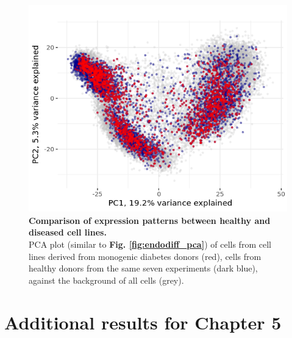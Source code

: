 \begin{figure}[h]
    \centering
    \includegraphics[width=15cm]{Appendix2/Fig/suppl_diabetes_lines.png}
    \caption[PCA of healthy and diseased cell lines]{\textbf{Comparison of expression patterns between healthy and diseased cell lines.}\\
    PCA plot (similar to \textbf{Fig. \ref{fig:endodiff_pca}}) of cells from cell lines derived from monogenic diabetes donors (red), cells from healthy donors from the same seven experiments (dark blue), against the background of all cells (grey). }
    \label{suppl_fig:pca_diabetes_lines}
\end{figure}


\clearpage

\section{Additional results for Chapter 5}

